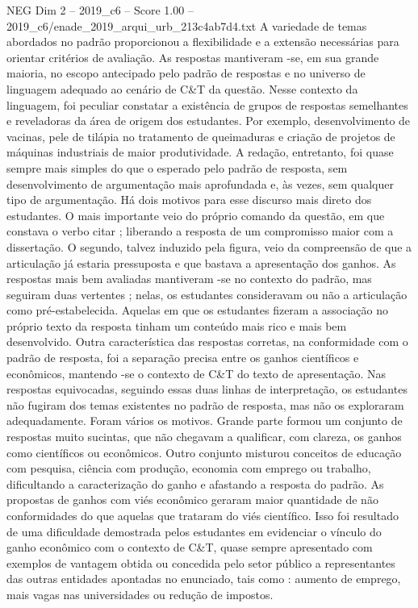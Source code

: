 \begin{textsample}{NEG Dim 2 – 2019\_c6 – Score 1.00 – 2019\_c6/enade\_2019\_arqui\_urb\_213c4ab7d4.txt}
A variedade de temas abordados no padrão proporcionou a flexibilidade e a extensão necessárias para orientar critérios de avaliação.
As respostas mantiveram -se, em sua grande maioria, no escopo antecipado pelo padrão de respostas e no universo de linguagem adequado ao cenário de C\&T da questão.
Nesse contexto da linguagem, foi peculiar constatar a existência de grupos de respostas semelhantes e reveladoras da área de origem dos estudantes.
Por exemplo, desenvolvimento de vacinas, pele de tilápia no tratamento de queimaduras e criação de projetos de máquinas industriais de maior produtividade.
A redação, entretanto, foi quase sempre mais simples do que o esperado pelo padrão de resposta, sem desenvolvimento de argumentação mais aprofundada e, às vezes, sem qualquer tipo de argumentação.
Há dois motivos para esse discurso mais direto dos estudantes.
O mais importante veio do próprio comando da questão, em que constava o verbo citar ; liberando a resposta de um compromisso maior com a dissertação.
O segundo, talvez induzido pela figura, veio da compreensão de que a articulação já estaria pressuposta e que bastava a apresentação dos ganhos.
As respostas mais bem avaliadas mantiveram -se no contexto do padrão, mas seguiram duas vertentes ; nelas, os estudantes consideravam ou não a articulação como pré-estabelecida.
Aquelas em que os estudantes fizeram a associação no próprio texto da resposta tinham um conteúdo mais rico e mais bem desenvolvido.
Outra característica das respostas corretas, na conformidade com o padrão de resposta, foi a separação precisa entre os ganhos científicos e econômicos, mantendo -se o contexto de C\&T do texto de apresentação.
Nas respostas equivocadas, seguindo essas duas linhas de interpretação, os estudantes não fugiram dos temas existentes no padrão de resposta, mas não os exploraram adequadamente.
Foram vários os motivos.
Grande parte formou um conjunto de respostas muito sucintas, que não chegavam a qualificar, com clareza, os ganhos como científicos ou econômicos.
Outro conjunto misturou conceitos de educação com pesquisa, ciência com produção, economia com emprego ou trabalho, dificultando a caracterização do ganho e afastando a resposta do padrão.
As propostas de ganhos com viés econômico geraram maior quantidade de não conformidades do que aquelas que trataram do viés científico.
Isso foi resultado de uma dificuldade demostrada pelos estudantes em evidenciar o vínculo do ganho econômico com o contexto de C\&T, quase sempre apresentado com exemplos de vantagem obtida ou concedida pelo setor público a representantes das outras entidades apontadas no enunciado, tais como : aumento de emprego, mais vagas nas universidades ou redução de impostos.

\end{textsample}
